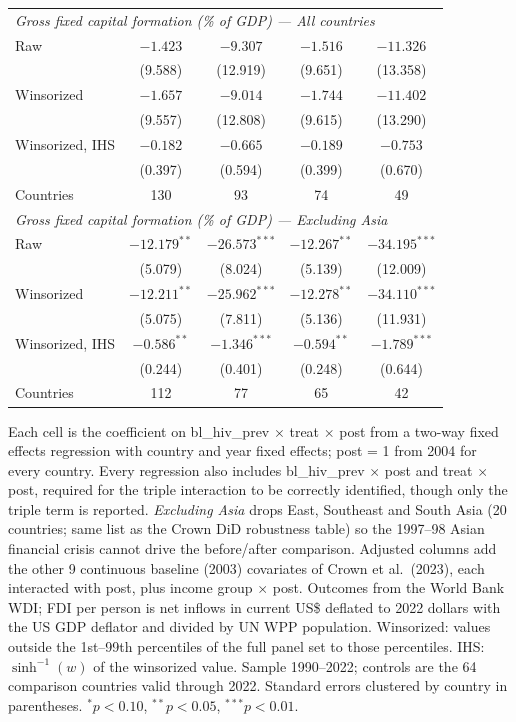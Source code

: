 \begin{table}[htbp]
\begin{tabular}{lcccc}
\midrule
\multicolumn{5}{l}{\textit{Gross fixed capital formation (\% of GDP) --- All countries}} \\
Raw & $-1.423$ & $-9.307$ & $-1.516$ & $-11.326$ \\
 & (9.588) & (12.919) & (9.651) & (13.358) \\
Winsorized & $-1.657$ & $-9.014$ & $-1.744$ & $-11.402$ \\
 & (9.557) & (12.808) & (9.615) & (13.290) \\
Winsorized, IHS & $-0.182$ & $-0.665$ & $-0.189$ & $-0.753$ \\
 & (0.397) & (0.594) & (0.399) & (0.670) \\
Countries & 130 & 93 & 74 & 49 \\
\midrule
\multicolumn{5}{l}{\textit{Gross fixed capital formation (\% of GDP) --- Excluding Asia}} \\
Raw & $-12.179^{**}$ & $-26.573^{***}$ & $-12.267^{**}$ & $-34.195^{***}$ \\
 & (5.079) & (8.024) & (5.139) & (12.009) \\
Winsorized & $-12.211^{**}$ & $-25.962^{***}$ & $-12.278^{**}$ & $-34.110^{***}$ \\
 & (5.075) & (7.811) & (5.136) & (11.931) \\
Winsorized, IHS & $-0.586^{**}$ & $-1.346^{***}$ & $-0.594^{**}$ & $-1.789^{***}$ \\
 & (0.244) & (0.401) & (0.248) & (0.644) \\
Countries & 112 & 77 & 65 & 42 \\
\bottomrule
\end{tabular}
\par\vspace{4pt}
\begin{minipage}{\textwidth}\footnotesize Each cell is the coefficient on bl\_hiv\_prev $\times$ treat $\times$ post from a two-way fixed effects regression with country and year fixed effects; post = 1 from 2004 for every country. Every regression also includes bl\_hiv\_prev $\times$ post and treat $\times$ post, required for the triple interaction to be correctly identified, though only the triple term is reported. \textit{Excluding Asia} drops East, Southeast and South Asia (20 countries; same list as the Crown DiD robustness table) so the 1997--98 Asian financial crisis cannot drive the before/after comparison. Adjusted columns add the other 9 continuous baseline (2003) covariates of Crown et al.\ (2023), each interacted with post, plus income group $\times$ post. Outcomes from the World Bank WDI; FDI per person is net inflows in current US\$ deflated to 2022 dollars with the US GDP deflator and divided by UN WPP population. Winsorized: values outside the 1st--99th percentiles of the full panel set to those percentiles. IHS: $\sinh^{-1}(w)$ of the winsorized value. Sample 1990--2022; controls are the 64 comparison countries valid through 2022. Standard errors clustered by country in parentheses. $^{*}p<0.10$, $^{**}p<0.05$, $^{***}p<0.01$.\end{minipage}
\end{table}
